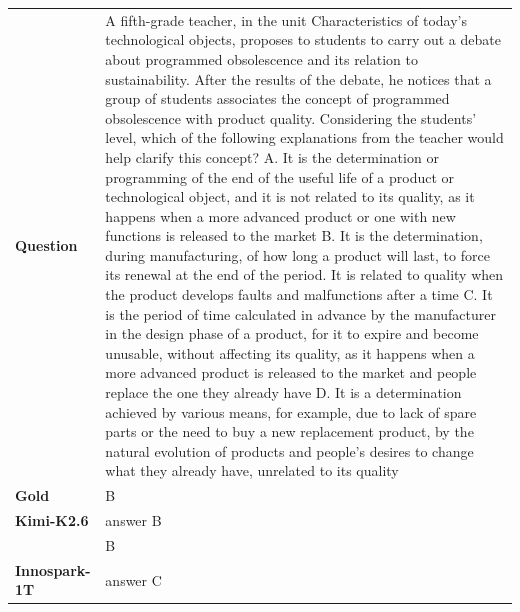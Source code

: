 \begin{longtable}{@{}l p{12.5cm}@{}}
  \textbf{Question} & A fifth-grade teacher, in the unit Characteristics of today's technological objects, proposes to students to carry out a debate about programmed obsolescence and its relation to sustainability. After the results of the debate, he notices that a group of students associates the concept of programmed obsolescence with product quality. Considering the students' level, which of the following explanations from the teacher would help clarify this concept? \newline A. It is the determination or programming of the end of the useful life of a product or technological object, and it is not related to its quality, as it happens when a more advanced product or one with new functions is released to the market \newline B. It is the determination, during manufacturing, of how long a product will last, to force its renewal at the end of the period. It is related to quality when the product develops faults and malfunctions after a time \newline C. It is the period of time calculated in advance by the manufacturer in the design phase of a product, for it to expire and become unusable, without affecting its quality, as it happens when a more advanced product is released to the market and people replace the one they already have \newline D. It is a determination achieved by various means, for example, due to lack of spare parts or the need to buy a new replacement product, by the natural evolution of products and people's desires to change what they already have, unrelated to its quality \\
  \textbf{Gold} & B \\
  \midrule
  \textbf{Kimi-K2.6} & answer B \\
  & B \\
  \textbf{Innospark-1T} & answer C \\

\end{longtable}
